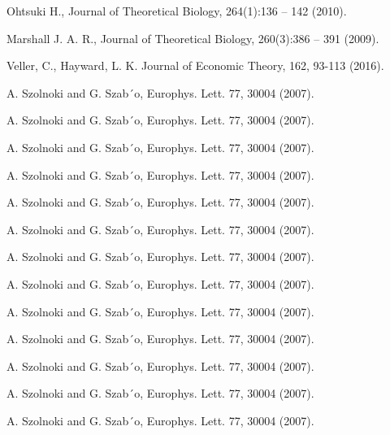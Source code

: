 \documentclass[%
 aip,
 amsmath,amssymb,
 reprint,%
]{revtex4-1}
\begin{document}
\begin{thebibliography}{99}
Ohtsuki H.,
\newblock Journal of Theoretical Biology, 264(1):136 – 142 (2010).

Marshall J. A. R.,
\newblock  Journal of Theoretical Biology, 260(3):386 – 391 (2009).

Veller, C.,  Hayward, L. K.
\newblock   Journal of Economic Theory, 162, 93-113 (2016).




A. Szolnoki and G. Szab´o,
\newblock  Europhys. Lett. 77, 30004 (2007).

A. Szolnoki and G. Szab´o,
\newblock  Europhys. Lett. 77, 30004 (2007).

A. Szolnoki and G. Szab´o,
\newblock  Europhys. Lett. 77, 30004 (2007).

A. Szolnoki and G. Szab´o,
\newblock  Europhys. Lett. 77, 30004 (2007).

A. Szolnoki and G. Szab´o,
\newblock  Europhys. Lett. 77, 30004 (2007).

A. Szolnoki and G. Szab´o,
\newblock  Europhys. Lett. 77, 30004 (2007).

A. Szolnoki and G. Szab´o,
\newblock  Europhys. Lett. 77, 30004 (2007).

A. Szolnoki and G. Szab´o,
\newblock  Europhys. Lett. 77, 30004 (2007).

A. Szolnoki and G. Szab´o,
\newblock  Europhys. Lett. 77, 30004 (2007).

A. Szolnoki and G. Szab´o,
\newblock  Europhys. Lett. 77, 30004 (2007).

A. Szolnoki and G. Szab´o,
\newblock  Europhys. Lett. 77, 30004 (2007).

A. Szolnoki and G. Szab´o,
\newblock  Europhys. Lett. 77, 30004 (2007).

A. Szolnoki and G. Szab´o,
\newblock  Europhys. Lett. 77, 30004 (2007).


\end{thebibliography}
\end{document}
